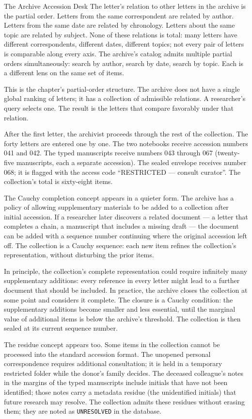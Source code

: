 \begin{coda}{The Archive Accession Desk}
The letter's relation to other letters in the archive is the partial order.
Letters from the same correspondent are related by author. Letters from the
same date are related by chronology. Letters about the same topic are
related by subject. None of these relations is total: many letters have
different correspondents, different dates, different topics; not every pair
of letters is comparable along every axis. The archive's catalog admits
multiple partial orders simultaneously: search by author, search by date,
search by topic. Each is a different lens on the same set of items.

This is the chapter's partial-order structure. The archive does not have a
single global ranking of letters; it has a collection of admissible
relations. A researcher's query selects one. The result is the letters
that compare favorably under that relation.

After the first letter, the archivist proceeds through the rest of the
collection. The forty letters are entered one by one. The two notebooks
receive accession numbers 041 and 042. The typed manuscripts receive
numbers 043 through 067 (twenty-five manuscripts, each a separate
accession). The sealed envelope receives number 068; it is flagged with the
access code ``RESTRICTED --- consult curator''. The collection's total is
sixty-eight items.

The Cauchy completion concept appears in a quieter form. The archive has a
policy of allowing supplementary materials to be added to a collection
after initial accession. If a researcher later discovers a related
document --- a letter that completes a chain, a manuscript that includes a
missing draft --- the document can be added with a sequence number
continuing where the original accession left off. The collection is a
Cauchy sequence: each new item refines the collection's representation,
without disturbing the prior items.

In principle, the collection's complete representation could require
infinitely many supplementary additions: every reference in every letter
might lead to a further document that should be included. In practice, the
archive closes the collection at some point and considers it complete. The
closure is a Cauchy condition: the supplementary additions become smaller
and less essential, until the marginal value of additional items is below
the archive's threshold. The collection is then sealed at its current
sequence number.

The residue concept appears too. Some items in the collection cannot be
processed into the standard accession format. The unopened personal
correspondence requires additional consultation; it is held in a temporary
restricted folder while the donor's family decides. The deceased
colleague's notes in the margins of the typed manuscripts include initials
that have not been identified; those notes carry a metadata residue (the
unidentified initials) that future research may resolve. The collection
admits these residues without erasing them; they are noted as
\texttt{UNRESOLVED} in the database.


\end{coda}
